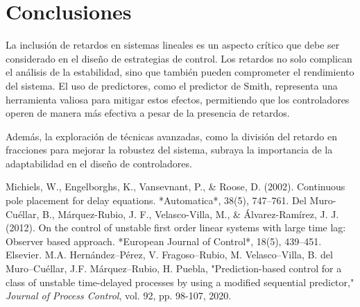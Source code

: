 \documentclass[conference]{IEEEtran}
\begin{document}
\section{Conclusiones}
La inclusión de retardos en sistemas lineales es un aspecto crítico que debe ser considerado en el diseño de estrategias de control. Los retardos no solo complican el análisis de la estabilidad, sino que también pueden comprometer el rendimiento del sistema. El uso de predictores, como el predictor de Smith, representa una herramienta valiosa para mitigar estos efectos, permitiendo que los controladores operen de manera más efectiva a pesar de la presencia de retardos.

Además, la exploración de técnicas avanzadas, como la división del retardo en fracciones para mejorar la robustez del sistema, subraya la importancia de la adaptabilidad en el diseño de controladores.

\begin{thebibliography}{00}
	Michiels, W., Engelborghs, K., Vansevnant, P., \& Roose, D. (2002). Continuous pole placement for delay equations. *Automatica*, 38(5), 747–761.
	Del Muro-Cuéllar, B., Márquez-Rubio, J. F., Velasco-Villa, M., \& Álvarez-Ramírez, J. J. (2012). On the control of unstable first order linear systems with large time lag: Observer based approach. *European Journal of Control*, 18(5), 439–451. Elsevier.
	M.A. Hernández–Pérez, V. Fragoso–Rubio, M. Velasco–Villa, B. del Muro–Cuéllar, J.F. Márquez–Rubio, H. Puebla, "Prediction-based control for a class of unstable time-delayed processes by using a modified sequential predictor," \textit{Journal of Process Control}, vol. 92, pp. 98-107, 2020.
\end{thebibliography}
\end{document}
